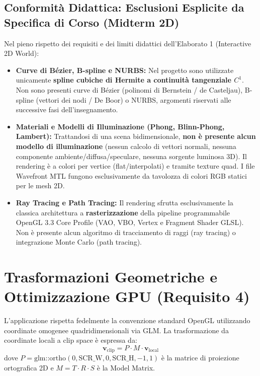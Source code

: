 \documentclass[11pt,a4paper]{article}
\begin{document}
\subsection{Conformità Didattica: Esclusioni Esplicite da Specifica di Corso (Midterm 2D)}
Nel pieno rispetto dei requisiti e dei limiti didattici dell'Elaborato 1 (Interactive 2D World):
\begin{itemize}
    \item \textbf{Curve di B\'ezier, B-spline e NURBS:} Nel progetto sono utilizzate unicamente \textbf{spline cubiche di Hermite a continuit\`a tangenziale $C^1$}. Non sono presenti curve di B\'ezier (polinomi di Bernstein / de Casteljau), B-spline (vettori dei nodi / De Boor) o NURBS, argomenti riservati alle successive fasi dell'insegnamento.
    \item \textbf{Materiali e Modelli di Illuminazione (Phong, Blinn-Phong, Lambert):} Trattandosi di una scena bidimensionale, \textbf{non \`e presente alcun modello di illuminazione} (nessun calcolo di vettori normali, nessuna componente ambiente/diffusa/speculare, nessuna sorgente luminosa 3D). Il rendering \`e a colori per vertice (flat/interpolati) e tramite texture quad. I file Wavefront MTL fungono esclusivamente da tavolozza di colori RGB statici per le mesh 2D.
    \item \textbf{Ray Tracing e Path Tracing:} Il rendering sfrutta esclusivamente la classica architettura a \textbf{rasterizzazione} della pipeline programmabile OpenGL 3.3 Core Profile (VAO, VBO, Vertex e Fragment Shader GLSL). Non \`e presente alcun algoritmo di tracciamento di raggi (ray tracing) o integrazione Monte Carlo (path tracing).
\end{itemize}

\section{Trasformazioni Geometriche e Ottimizzazione GPU (Requisito 4)}

L'applicazione rispetta fedelmente la convenzione standard OpenGL utilizzando coordinate omogenee quadridimensionali via GLM. La trasformazione da coordinate locali a clip space è espressa da:
\begin{equation}
\mathbf{v}_{\text{clip}} = P \cdot M \cdot \mathbf{v}_{\text{local}}
\end{equation}
dove $P = \text{glm::ortho}(0, \text{SCR\_W}, 0, \text{SCR\_H}, -1, 1)$ è la matrice di proiezione ortografica 2D e $M = T \cdot R \cdot S$ è la Model Matrix.
\end{document}
